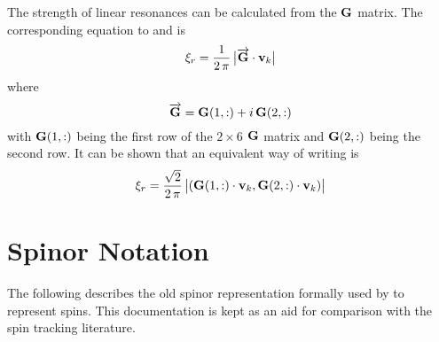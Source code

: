 The strength of linear resonances can be calculated from the ${\bf G}$ matrix.  The corresponding
equation to  and  is\cite{b:spin.hoff}
\begin{equation}
  \xi_r = \frac{1}{2 \, \pi} \, \big| \overrightarrow{{\bf G}} \cdot {\bf v}_k \big|
  \label{x1pg}
\end{equation}
where 
\begin{equation}
  \overrightarrow{{\bf G}} = {\bf G}(1,:) + i \, {\bf G}(2,:)
\end{equation}
with ${\bf G}(1,:)$ being the first row of the $2\times6$ ${\bf G}$ matrix and ${\bf G}(2,:)$ being
the second row. It can be shown that an equivalent way of writing  is 
\begin{equation}
  \xi_r = \frac{\sqrt{2}}{2 \, \pi} \, \big| ({\bf G}(1,:) \cdot {\bf v}_k, {\bf G}(2,:) \cdot {\bf v}_k) \big|
  \label{x2pg}
\end{equation}


\section{Spinor Notation}

The following describes the old spinor representation formally used by \bmad to represent
spins. This documentation is kept as an aid for comparison with the spin tracking literature.

